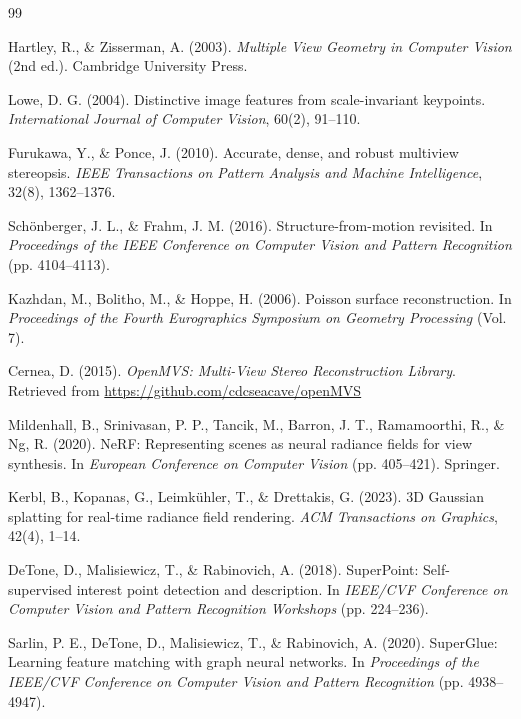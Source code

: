 \renewcommand{\bibname}{НОМ ЗҮЙ}
\begin{thebibliography}{99}

Hartley, R., \& Zisserman, A. (2003). \textit{Multiple View Geometry in Computer Vision} (2nd ed.). Cambridge University Press.

Lowe, D. G. (2004). Distinctive image features from scale-invariant keypoints. \textit{International Journal of Computer Vision}, 60(2), 91--110.

Furukawa, Y., \& Ponce, J. (2010). Accurate, dense, and robust multiview stereopsis. \textit{IEEE Transactions on Pattern Analysis and Machine Intelligence}, 32(8), 1362--1376.

Sch{\"o}nberger, J. L., \& Frahm, J. M. (2016). Structure-from-motion revisited. In \textit{Proceedings of the IEEE Conference on Computer Vision and Pattern Recognition} (pp. 4104--4113).

Kazhdan, M., Bolitho, M., \& Hoppe, H. (2006). Poisson surface reconstruction. In \textit{Proceedings of the Fourth Eurographics Symposium on Geometry Processing} (Vol. 7).

Cernea, D. (2015). \textit{OpenMVS: Multi-View Stereo Reconstruction Library}. Retrieved from \url{https://github.com/cdcseacave/openMVS}

Mildenhall, B., Srinivasan, P. P., Tancik, M., Barron, J. T., Ramamoorthi, R., \& Ng, R. (2020). NeRF: Representing scenes as neural radiance fields for view synthesis. In \textit{European Conference on Computer Vision} (pp. 405--421). Springer.

Kerbl, B., Kopanas, G., Leimk{\"u}hler, T., \& Drettakis, G. (2023). 3D Gaussian splatting for real-time radiance field rendering. \textit{ACM Transactions on Graphics}, 42(4), 1--14.

DeTone, D., Malisiewicz, T., \& Rabinovich, A. (2018). SuperPoint: Self-supervised interest point detection and description. In \textit{IEEE/CVF Conference on Computer Vision and Pattern Recognition Workshops} (pp. 224--236).

Sarlin, P. E., DeTone, D., Malisiewicz, T., \& Rabinovich, A. (2020). SuperGlue: Learning feature matching with graph neural networks. In \textit{Proceedings of the IEEE/CVF Conference on Computer Vision and Pattern Recognition} (pp. 4938--4947).


\end{thebibliography}
